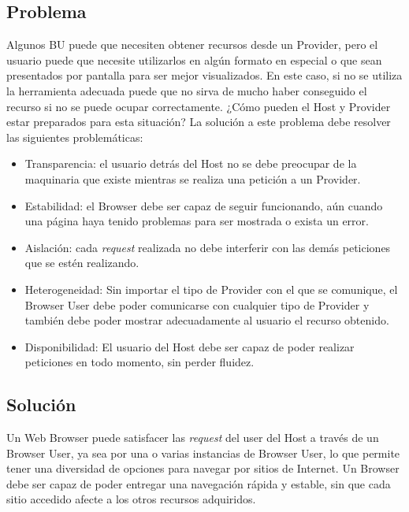 \subsection{Problema}
Algunos BU puede que necesiten obtener recursos desde un Provider, pero el usuario puede que necesite utilizarlos en algún formato en especial o que sean presentados por pantalla para ser mejor visualizados. En este caso, si no se utiliza la herramienta adecuada puede que no sirva de mucho haber conseguido el recurso si no se puede ocupar correctamente. ¿Cómo pueden el Host y Provider estar preparados para esta situación?
La solución a este problema debe resolver las siguientes problemáticas:
\begin{itemize}
	\item Transparencia: el usuario detrás del Host no se debe preocupar de la maquinaria que existe mientras se realiza una petición a un Provider.
	\item Estabilidad: el Browser debe ser capaz de seguir funcionando, aún cuando una página haya tenido problemas para ser mostrada o exista un error.
	\item Aislación: cada \textit{request} realizada no debe interferir con las demás peticiones que se estén realizando.
	\item Heterogeneidad: Sin importar el tipo de Provider con el que se comunique, el Browser User debe poder comunicarse con cualquier tipo de Provider y también debe poder mostrar adecuadamente al usuario el recurso obtenido.
	\item Disponibilidad: El usuario del Host debe ser capaz de poder realizar peticiones en todo momento, sin perder fluidez.
\end{itemize}

\subsection{Solución}
Un Web Browser puede satisfacer las \textit{request} del user del Host a través de un Browser User, ya sea por una o varias instancias de Browser User, lo que permite tener una diversidad de opciones para navegar por sitios de Internet. Un Browser debe ser capaz de poder entregar una navegación rápida y estable, sin que cada sitio accedido afecte a los otros recursos adquiridos.
